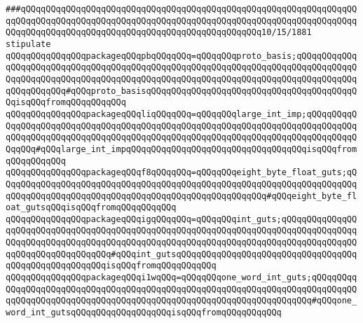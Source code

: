 \verb|###qQQqqQQqqQQqqQQqqQQqqQQqqQQqqQQqqQQqqQQqqQQqqQQqqQQqqQQqqQQqqQQqqQQqqQQqqQQqqQQqqQQqqQQqqQQqqQQqqQQqqQQqqQQqqQQqqQQqqQQqqQQqqQQqqQQqqQQqqQQqqQQqqQQqqQQqqQQqqQQqqQQqqQQqqQQqqQQqqQQqqQQqqQQq10/15/1881|\newline
\newline
\newline
\newline
\verb|stipulate|\newline
\verb|qQQqqQQqqQQqqQQqpackageqQQqpbqQQqqQQq=qQQqqQQqproto_basis;qQQqqQQqqQQqqQQqqQQqqQQqqQQqqQQqqQQqqQQqqQQqqQQqqQQqqQQqqQQqqQQqqQQqqQQqqQQqqQQqqQQqqQQqqQQqqQQqqQQqqQQqqQQqqQQqqQQqqQQqqQQqqQQqqQQqqQQqqQQqqQQqqQQqqQQqqQQqqQQqqQQq#qQQqproto_basisqQQqqQQqqQQqqQQqqQQqqQQqqQQqqQQqqQQqqQQqqQQqisqQQqfromqQQqqQQqqQQq|\newline
\verb|qQQqqQQqqQQqqQQqpackageqQQqliqQQqqQQq=qQQqqQQqlarge_int_imp;qQQqqQQqqQQqqQQqqQQqqQQqqQQqqQQqqQQqqQQqqQQqqQQqqQQqqQQqqQQqqQQqqQQqqQQqqQQqqQQqqQQqqQQqqQQqqQQqqQQqqQQqqQQqqQQqqQQqqQQqqQQqqQQqqQQqqQQqqQQqqQQqqQQqqQQqqQQq#qQQqlarge_int_impqQQqqQQqqQQqqQQqqQQqqQQqqQQqqQQqqQQqisqQQqfromqQQqqQQqqQQq|\newline
\verb|qQQqqQQqqQQqqQQqpackageqQQqf8qQQqqQQq=qQQqqQQqeight_byte_float_guts;qQQqqQQqqQQqqQQqqQQqqQQqqQQqqQQqqQQqqQQqqQQqqQQqqQQqqQQqqQQqqQQqqQQqqQQqqQQqqQQqqQQqqQQqqQQqqQQqqQQqqQQqqQQqqQQqqQQqqQQqqQQq#qQQqeight_byte_float_gutsqQQqisqQQqfromqQQqqQQqqQQq|\newline
\verb|qQQqqQQqqQQqqQQqpackageqQQqigqQQqqQQq=qQQqqQQqint_guts;qQQqqQQqqQQqqQQqqQQqqQQqqQQqqQQqqQQqqQQqqQQqqQQqqQQqqQQqqQQqqQQqqQQqqQQqqQQqqQQqqQQqqQQqqQQqqQQqqQQqqQQqqQQqqQQqqQQqqQQqqQQqqQQqqQQqqQQqqQQqqQQqqQQqqQQqqQQqqQQqqQQqqQQqqQQqqQQq#qQQqint_gutsqQQqqQQqqQQqqQQqqQQqqQQqqQQqqQQqqQQqqQQqqQQqqQQqqQQqqQQqisqQQqfromqQQqqQQqqQQq|\newline
\verb|qQQqqQQqqQQqqQQqpackageqQQqi1wqQQq=qQQqqQQqone_word_int_guts;qQQqqQQqqQQqqQQqqQQqqQQqqQQqqQQqqQQqqQQqqQQqqQQqqQQqqQQqqQQqqQQqqQQqqQQqqQQqqQQqqQQqqQQqqQQqqQQqqQQqqQQqqQQqqQQqqQQqqQQqqQQqqQQqqQQqqQQqqQQq#qQQqone_word_int_gutsqQQqqQQqqQQqqQQqqQQqisqQQqfromqQQqqQQqqQQq|\newline
